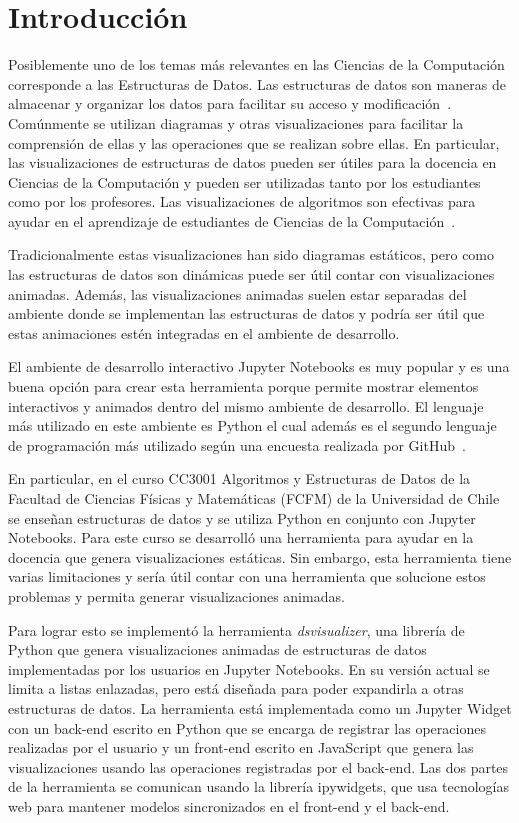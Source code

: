 \chapter{Introducción}

Posiblemente uno de los temas más relevantes en las Ciencias de la Computación corresponde a las Estructuras de Datos. Las estructuras de datos son maneras de almacenar y organizar los datos para facilitar su acceso y modificación~\cite{Algorithms}. Comúnmente se utilizan diagramas y otras visualizaciones para facilitar la comprensión de ellas y las operaciones que se realizan sobre ellas. En particular, las visualizaciones de estructuras de datos pueden ser útiles para la docencia en Ciencias de la Computación y pueden ser utilizadas tanto por los estudiantes como por los profesores. Las visualizaciones de algoritmos son efectivas para ayudar en el aprendizaje de estudiantes de Ciencias de la Computación~\cite{Hundhausen2002}.

Tradicionalmente estas visualizaciones han sido diagramas estáticos, pero como las estructuras de datos son dinámicas puede ser útil contar con visualizaciones animadas. Además, las visualizaciones animadas suelen estar separadas del ambiente donde se implementan las estructuras de datos y podría ser útil que estas animaciones estén integradas en el ambiente de desarrollo.

El ambiente de desarrollo interactivo Jupyter Notebooks es muy popular y es una buena opción para crear esta herramienta porque permite mostrar elementos interactivos y animados dentro del mismo ambiente de desarrollo. El lenguaje más utilizado en este ambiente es Python el cual además es el segundo lenguaje de programación más utilizado según una encuesta realizada por GitHub~\cite{encuesta-github}.

En particular, en el curso CC3001 Algoritmos y Estructuras de Datos de la Facultad de Ciencias Físicas y Matemáticas (FCFM) de la Universidad de Chile se enseñan estructuras de datos y se utiliza Python en conjunto con Jupyter Notebooks. Para este curso se desarrolló una herramienta para ayudar en la docencia que genera visualizaciones estáticas. Sin embargo, esta herramienta tiene varias limitaciones y sería útil contar con una herramienta que solucione estos problemas y permita generar visualizaciones animadas. 

Para lograr esto se implementó la herramienta \textit{dsvisualizer}, una librería de Python que genera visualizaciones animadas de estructuras de datos implementadas por los usuarios en Jupyter Notebooks. En su versión actual se limita a listas enlazadas, pero está diseñada para poder expandirla a otras estructuras de datos. La herramienta está implementada como un Jupyter Widget con un back-end escrito en Python que se encarga de registrar las operaciones realizadas por el usuario y un front-end escrito en JavaScript que genera las visualizaciones usando las operaciones registradas por el back-end. Las dos partes de la herramienta se comunican usando la librería ipywidgets, que usa tecnologías web para mantener modelos sincronizados en el front-end y el back-end.

